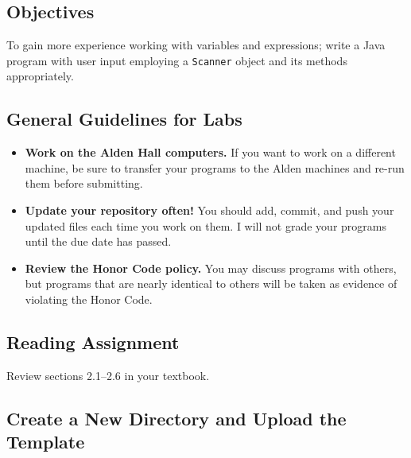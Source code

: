



\vspace{-0.15in}
\subsection*{Objectives}

To gain more experience working with variables and expressions; write a Java program with user input employing a {\tt Scanner} object and its methods appropriately.

\vspace{-0.15in}
\subsection*{General Guidelines for Labs}
\begin{itemize}
\item
{\bf Work on the Alden Hall computers.} If you want to work on a different
machine, be sure to transfer your programs to the Alden
machines and re-run them before submitting.
\item
{\bf Update your repository often!} You should add, commit, 
and push your updated files each time you work on them.  I will not grade 
your programs until the due date has passed.
\item
{\bf Review the Honor Code policy.} You
may discuss programs with others, but programs that are nearly identical
to others will be taken as evidence of violating the Honor Code.
\end{itemize}

\vspace{-0.15in}
\subsection*{Reading Assignment}

Review sections 2.1--2.6 in your textbook. 

\vspace{-0.15in}
\subsection*{Create a New Directory and Upload the Template}

